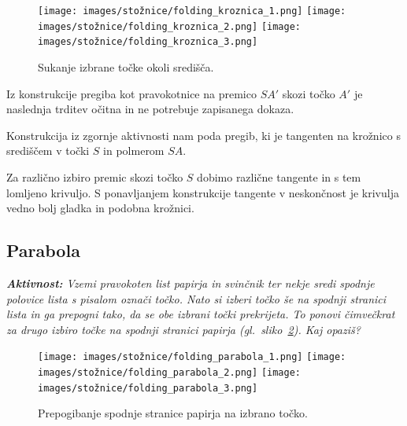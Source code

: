 \begin{figure}[h]
    \centering
    \texttt{[image: images/stožnice/folding\_kroznica\_1.png]}
    \texttt{[image: images/stožnice/folding\_kroznica\_2.png]}
    \texttt{[image: images/stožnice/folding\_kroznica\_3.png]}
    \caption[Prepogibanje krožnice]{Sukanje izbrane točke okoli središča.}
    \label{fig:koraki_kroznica}
\end{figure}


Iz konstrukcije pregiba kot pravokotnice na premico $SA'$ skozi točko $A'$ je naslednja trditev očitna in ne potrebuje zapisanega dokaza.

\begin{trditev}
    Konstrukcija iz zgornje aktivnosti nam poda pregib, ki je tangenten na krožnico s središčem v točki $S$ in polmerom $SA$.
\end{trditev}

Za različno izbiro premic skozi točko $S$ dobimo različne tangente in s tem lomljeno krivuljo. S ponavljanjem konstrukcije tangente v neskončnost je krivulja vedno bolj gladka in podobna krožnici.

\subsection{Parabola}

\textit{\textbf{Aktivnost:} Vzemi pravokoten list papirja in svinčnik ter nekje sredi spodnje polovice lista s pisalom označi točko. Nato si izberi točko še na spodnji stranici lista in ga prepogni tako, da se obe izbrani točki prekrijeta. To ponovi čimvečkrat za drugo izbiro točke na spodnji stranici papirja (gl.\ sliko~\ref{fig:koraki_parabola}). Kaj opaziš?}

\begin{figure}[h]
    \centering
    \texttt{[image: images/stožnice/folding\_parabola\_1.png]}
    \texttt{[image: images/stožnice/folding\_parabola\_2.png]}
    \texttt{[image: images/stožnice/folding\_parabola\_3.png]}
    \caption[Prepogibanje parabole]{Prepogibanje spodnje stranice papirja na izbrano točko.}
    \label{fig:koraki_parabola}
\end{figure}


